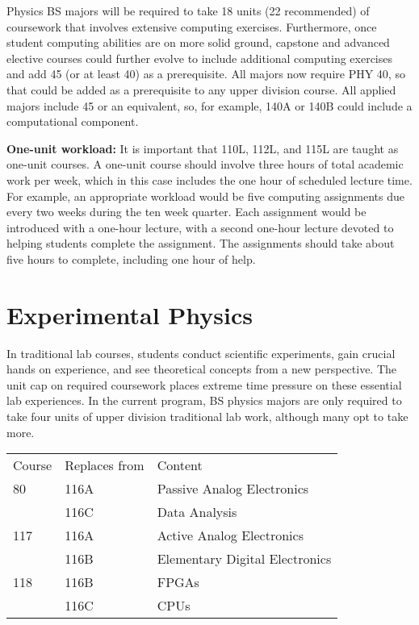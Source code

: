 \documentclass[12pt]{article}
\begin{document}
Physics BS majors will be required to take 18 units (22 recommended)
of coursework that involves extensive computing exercises.
Furthermore, once student computing abilities are on more solid
ground, capstone and advanced elective courses could further evolve to
include additional computing exercises and add 45 (or at least 40) as
a prerequisite.  All majors now require PHY 40, so that could be added
as a prerequisite to any upper division course.  All applied majors
include 45 or an equivalent, so, for example, 140A or 140B could include
a computational component.

{\bf One-unit workload: }It is important that 110L, 112L, and 115L are
taught as one-unit courses.  A one-unit course should involve three
hours of total academic work per week, which in this case includes the
one hour of scheduled lecture time.  For example, an appropriate
workload would be five computing assignments due every two weeks
during the ten week quarter.  Each assignment would be introduced with
a one-hour lecture, with a second one-hour lecture devoted to helping
students complete the assignment.  The assignments should take about
five hours to complete, including one hour of help.

\section{Experimental Physics}
\label{sec:labs}

In traditional lab courses, students conduct scientific experiments,
gain crucial hands on experience, and see theoretical concepts from a
new perspective.  The unit cap on required coursework places extreme
time pressure on these essential lab experiences. In the current
program, BS physics majors are only required to take four units of
upper division traditional lab work, although many opt to take more.

\noindent
\vskip 0.25cm
\begin{center}
\begin{tabular}{|lll|}
\hline
Course  & Replaces from & Content \\
80      & 116A        & Passive Analog Electronics \\
        & 116C        & Data Analysis \\
117     & 116A        & Active Analog Electronics \\
        & 116B        & Elementary Digital Electronics \\
118     & 116B        & FPGAs\\
        & 116C        & CPUs\\
\hline
\end{tabular}
\end{center}
\end{document}
